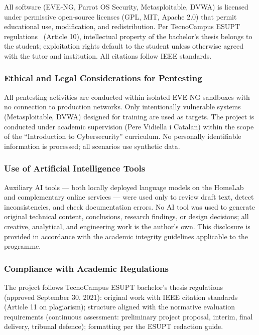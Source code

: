 All software (EVE-NG, Parrot OS Security, Metasploitable, DVWA) is licensed under
permissive open-source licenses (GPL, MIT, Apache 2.0) that permit educational use,
modification, and redistribution. Per TecnoCampus ESUPT regulations~\cite{tecnocampus_normativa} (Article 10), intellectual property
of the bachelor's thesis belongs to the student; exploitation rights default to the
student unless otherwise agreed with the tutor and institution. All citations follow
IEEE standards.

\subsubsection{Ethical and Legal Considerations for Pentesting}

All pentesting activities are conducted within isolated EVE-NG sandboxes with no
connection to production networks. Only intentionally vulnerable systems (Metasploitable,
DVWA\cite{dvwa}) designed for training are used as targets. The project is
conducted under academic supervision (Pere Vidiella i Catalan) within the scope of the
``Introduction to Cybersecurity'' curriculum. No personally identifiable information
is processed; all scenarios use synthetic data.

\subsubsection{Use of Artificial Intelligence Tools}

Auxiliary AI tools --- both locally deployed language models on the HomeLab and
complementary online services --- were used only to review draft text, detect
inconsistencies, and check documentation errors. No AI tool was used to generate
original technical content, conclusions, research findings, or design decisions;
all creative, analytical, and engineering work is the author's own. This disclosure
is provided in accordance with the academic integrity guidelines applicable to the
programme.

\subsubsection{Compliance with Academic Regulations}

The project follows TecnoCampus ESUPT bachelor's thesis regulations~\cite{tecnocampus_normativa} (approved
September 30, 2021): original work with IEEE citation standards (Article 11 on
plagiarism); structure aligned with the normative evaluation requirements (continuous
assessment: preliminary project proposal, interim, final delivery, tribunal defence); formatting
per the ESUPT redaction guide.

